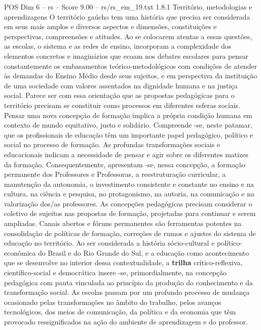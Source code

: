 \begin{textsample}{POS Dim 6 – rs – Score 9.00 – rs/rs\_em\_19.txt}  \label{ex:f6_pos_183}
1.8.1 Território, metodologias e aprendizagens O território gaúcho tem uma história que precisa ser considerada em seus mais amplos e diversos aspectos e dimensões, constituições e perspectivas, compreensões e atitudes.
Ao se colocarem atentas a essas questões, as escolas, o sistema e as redes de ensino, incorporam a complexidade dos elementos concretos e imaginários que ecoam nos debates escolares para pensar constantemente os embasamentos teórico-metodológicos com condições de atender às demandas do Ensino Médio desde seus sujeitos, e em perspectiva da instituição de uma sociedade com valores assentados na dignidade humana e na justiça social.
Parece ser com essa orientação que as propostas pedagógicas para o território precisam se constituir como processos em diferentes esferas sociais.
Pensar uma nova concepção de formação implica a própria condição humana em contexto de mundo equitativo, justo e solidário.
Compreende -se, neste patamar, que os profissionais de educação têm um importante papel pedagógico, político e social no processo de formação.
As profundas transformações sociais e educacionais indicam a necessidade de pensar e agir sobre os diferentes matizes da formação.
Consequentemente, apresentam -se, nessa concepção, a formação permanente dos Professores e Professoras, a reestruturação curricular, a manutenção da autonomia, o investimento consistente e constante no ensino e na cultura, na ciência e pesquisa, no protagonismo, na autoria, na comunicação e na valorização dos/as professores.
As concepções pedagógicas precisam considerar o coletivo de sujeitos nas propostas de formação, projetadas para continuar e serem ampliadas.
Canais abertos e fóruns permanentes são ferramentas potentes na consolidação de políticas de formação, correções de rumos e ajustes do sistema de educação no território.
Ao ser considerada a história sócio-cultural e político-econômica do Brasil e do Rio Grande do Sul, e a educação como acontecimento que se desenvolve no interior dessa contextualidade, a \textbf{trilha} crítico-reflexiva, científico-social e democrática insere -se, primordialmente, na concepção pedagógica com pauta vinculada ao princípio da produção do conhecimento e da transformação social.
As escolas passam por um profundo processo de mudança ocasionado pelas transformações no âmbito do trabalho, pelos avanços tecnológicos, dos meios de comunicação, da política e da economia que têm provocado ressignificados na ação do ambiente de aprendizagem e do professor.

\end{textsample}
